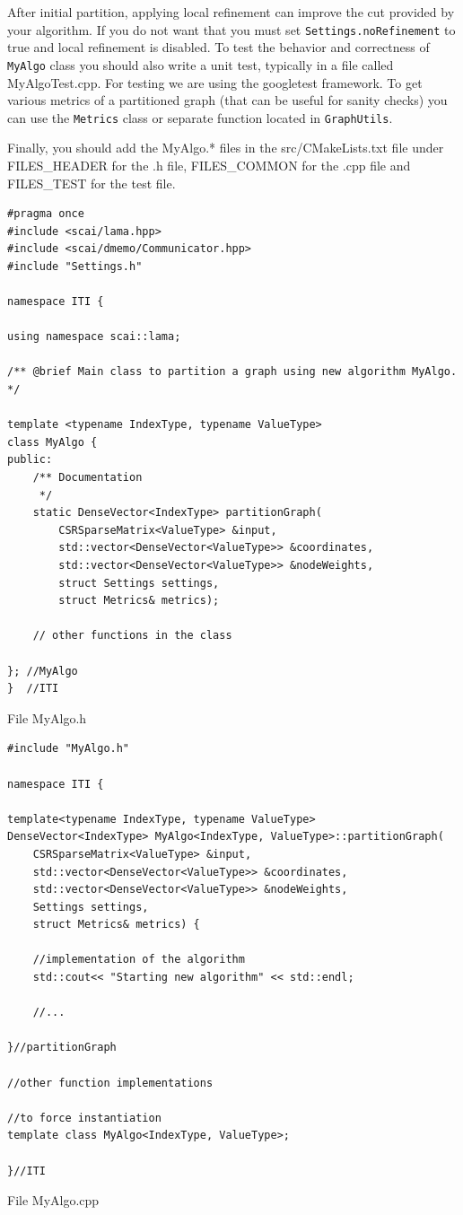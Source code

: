 \documentclass[a4paper,10pt]{article}
\newcommand{\MI}[1]{\texttt{#1}}
\begin{document}
After initial partition, applying local refinement can improve the cut provided by your algorithm. 
If you do not want that you must set \MI{Settings.noRefinement} to true and local refinement is disabled.
To test the behavior and correctness of \MI{MyAlgo} class you should also write a unit test,
typically in a file called MyAlgoTest.cpp. For testing we are using the googletest framework.
To get various metrics of a partitioned graph (that can be useful for sanity checks) you can
use the \MI{Metrics} class or separate function located in \MI{GraphUtils}.

Finally, you should add the MyAlgo.* files in the src/CMakeLists.txt file under FILES\_HEADER for the
.h file, FILES\_COMMON for the .cpp file and FILES\_TEST for the test file.


\begin{algorithm}
\begin{verbatim}
#pragma once
#include <scai/lama.hpp>
#include <scai/dmemo/Communicator.hpp>
#include "Settings.h"

namespace ITI {
	
using namespace scai::lama;

/** @brief Main class to partition a graph using new algorithm MyAlgo.
*/

template <typename IndexType, typename ValueType>
class MyAlgo {
public:
    /** Documentation
     */
    static DenseVector<IndexType> partitionGraph(
        CSRSparseMatrix<ValueType> &input,
        std::vector<DenseVector<ValueType>> &coordinates,
        std::vector<DenseVector<ValueType>> &nodeWeights,
        struct Settings settings,
        struct Metrics& metrics);
	
	// other functions in the class
	
}; //MyAlgo
}  //ITI
\end{verbatim}
\caption{File MyAlgo.h}
\label{MyAlgo.h}
\end{algorithm}

\begin{algorithm}
\begin{verbatim}
#include "MyAlgo.h"

namespace ITI {
	
template<typename IndexType, typename ValueType>
DenseVector<IndexType> MyAlgo<IndexType, ValueType>::partitionGraph(
    CSRSparseMatrix<ValueType> &input,
    std::vector<DenseVector<ValueType>> &coordinates,
    std::vector<DenseVector<ValueType>> &nodeWeights,
    Settings settings,
    struct Metrics& metrics) {
	
	//implementation of the algorithm
	std::cout<< "Starting new algorithm" << std::endl;
	
	//...
	
}//partitionGraph

//other function implementations

//to force instantiation
template class MyAlgo<IndexType, ValueType>;

}//ITI

\end{verbatim}
\caption{File MyAlgo.cpp}
\label{MyAlgo.cpp}
\end{algorithm}
\end{document}
